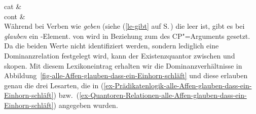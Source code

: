 { cat &  \\
  cont &  \\
}
\zs
Während bei Verben wie \emph{geben} (siehe (\ref{le-gibt} auf S.\,\pageref{le-gibt}) die \hconsl leer ist, gibt es bei \emph{glauben} ein
\qeq-Element. \argtwo von  wird in Beziehung zum \ltopw des CP"=Arguments
gesetzt. Da die beiden Werte nicht identifiziert werden, sondern lediglich eine Dominanzrelation
festgelegt wird, kann der Existenzquantor zwischen  und 
skopen. Mit diesem Lexikoneintrag erhalten wir die Dominanzverhältnisse in
Abbildung~\ref{fig-alle-Affen-glauben-dass-ein-Einhorn-schläft} und diese erlauben genau die drei
Lesarten, die in (\ref{ex-Prädikatenlogik-alle-Affen-glauben-dass-ein-Einhorn-schläft}) bzw.\
(\ref{ex-Quantoren-Relationen-alle-Affen-glauben-dass-ein-Einhorn-schläft}) angegeben wurden.

